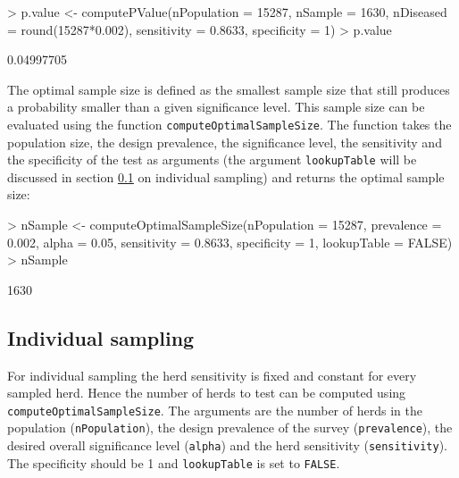 \documentclass[nojss]{jss}
\begin{document}
\begin{Schunk}
\begin{Sinput}
> p.value <- computePValue(nPopulation = 15287, nSample = 1630, 
       nDiseased = round(15287*0.002), sensitivity = 0.8633, specificity = 1)
> p.value
\end{Sinput}
\begin{Soutput}
[1] 0.04997705
\end{Soutput}
\end{Schunk}

The optimal sample size is defined as the smallest sample size that 
still produces a probability smaller than a given significance 
level. This sample size can be evaluated using the function 
\texttt{computeOptimalSampleSize}. 
The function takes the 
population size, the design prevalence, the significance level, the 
sensitivity and the specificity of the test as arguments (the 
argument \texttt{lookupTable} will be discussed in section 
\ref{subsec:ind-sampling-noclass} on individual sampling) and 
returns the optimal sample size: 

\begin{Schunk}
\begin{Sinput}
> nSample <- computeOptimalSampleSize(nPopulation = 15287, 
       prevalence = 0.002, alpha = 0.05, sensitivity = 0.8633, 
       specificity = 1, lookupTable = FALSE)
> nSample 
\end{Sinput}
\begin{Soutput}
[1] 1630
\end{Soutput}
\end{Schunk}


\subsection{Individual sampling} \label{subsec:ind-sampling-noclass}

For individual sampling the herd sensitivity is fixed and constant 
for every sampled herd. Hence the number of herds to test can be 
computed using \texttt{computeOptimalSampleSize}. The arguments are 
the number of herds in the population (\texttt{nPopulation}), the 
design prevalence of the survey (\texttt{prevalence}), the desired 
overall significance level (\texttt{alpha}) and the herd sensitivity 
(\texttt{sensitivity}). The specificity should be 1 and 
\texttt{lookupTable} is set to \texttt{FALSE}. 
\end{document}
